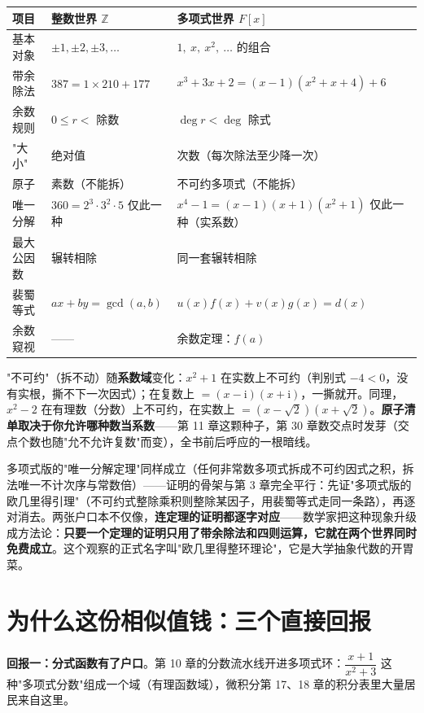 \begin{center}
\begin{tabular}{lll}
\toprule
项目 & 整数世界 $\mathbb{Z}$ & 多项式世界 $F[x]$ \\
\midrule
基本对象 & $\pm1, \pm2, \pm3, \dots$ & $1,\ x,\ x^2,\ \dots$ 的组合 \\
带余除法 & $387 = 1\times210 + 177$ & $x^3{+}3x{+}2 = (x{-}1)(x^2{+}x{+}4) + 6$ \\
余数规则 & $0 \le r < $ 除数 & $\deg r < \deg$ 除式 \\
"大小" & 绝对值 & 次数（每次除法至少降一次） \\
原子 & 素数（不能拆） & 不可约多项式（不能拆） \\
唯一分解 & $360 = 2^3\cdot3^2\cdot5$ 仅此一种 & $x^4 - 1 = (x{-}1)(x{+}1)(x^2{+}1)$ 仅此一种（实系数） \\
最大公因数 & 辗转相除 & 同一套辗转相除 \\
裴蜀等式 & $ax + by = \gcd(a,b)$ & $u(x)f(x) + v(x)g(x) = d(x)$ \\
余数窥视 & —— & 余数定理：$f(a)$ \\
\bottomrule
\end{tabular}
\end{center}

"不可约"（拆不动）随\textbf{系数域}变化：$x^2 + 1$ 在实数上不可约（判别式 $-4 < 0$，没有实根，撕不下一次因式）；在复数上 $= (x-\mathrm{i})(x+\mathrm{i})$，一撕就开。同理，$x^2 - 2$ 在有理数（分数）上不可约，在实数上 $= (x-\sqrt2)(x+\sqrt2)$。\textbf{原子清单取决于你允许哪种数当系数}——第 11 章这颗种子，第 30 章数交点时发芽（交点个数也随"允不允许复数"而变），全书前后呼应的一根暗线。

多项式版的"唯一分解定理"同样成立（任何非常数多项式拆成不可约因式之积，拆法唯一不计次序与常数倍）——证明的骨架与第 3 章完全平行：先证"多项式版的欧几里得引理"（不可约式整除乘积则整除某因子，用裴蜀等式走同一条路），再逐对消去。两张户口本不仅像，\textbf{连定理的证明都逐字对应}——数学家把这种现象升级成方法论：\textbf{只要一个定理的证明只用了带余除法和四则运算，它就在两个世界同时免费成立}。这个观察的正式名字叫"欧几里得整环理论"，它是大学抽象代数的开胃菜。

\section{为什么这份相似值钱：三个直接回报}

\textbf{回报一：分式函数有了户口}。第 10 章的分数流水线开进多项式环：$\dfrac{x+1}{x^2+3}$ 这种"多项式分数"组成一个域（有理函数域），微积分第 17、18 章的积分表里大量居民来自这里。

